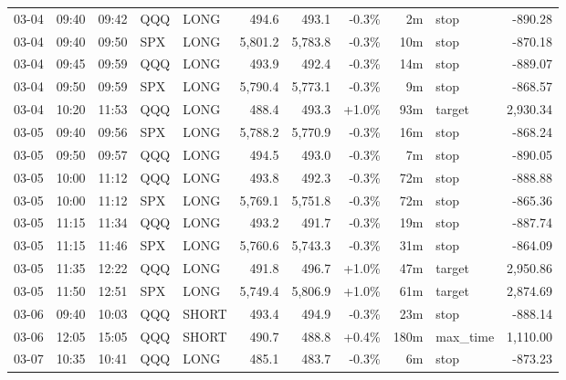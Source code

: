 \documentclass[11pt,a4paper,twoside]{article}
\begin{document}
\begin{center}
\begin{longtable}{>{\color{txtmain}}l l l l l r r r r >{\color{txtmain}}l r}
03-04 & 09:40 & 09:42 & QQQ & LONG & 494.6 & 493.1 & \textcolor{lossred}{-0.3\%} & 2m & stop & \textcolor{lossred}{-890.28} \\
03-04 & 09:40 & 09:50 & SPX & LONG & 5,801.2 & 5,783.8 & \textcolor{lossred}{-0.3\%} & 10m & stop & \textcolor{lossred}{-870.18} \\
03-04 & 09:45 & 09:59 & QQQ & LONG & 493.9 & 492.4 & \textcolor{lossred}{-0.3\%} & 14m & stop & \textcolor{lossred}{-889.07} \\
03-04 & 09:50 & 09:59 & SPX & LONG & 5,790.4 & 5,773.1 & \textcolor{lossred}{-0.3\%} & 9m & stop & \textcolor{lossred}{-868.57} \\
03-04 & 10:20 & 11:53 & QQQ & LONG & 488.4 & 493.3 & \textcolor{wingreen}{+1.0\%} & 93m & target & \textcolor{wingreen}{2,930.34} \\
03-05 & 09:40 & 09:56 & SPX & LONG & 5,788.2 & 5,770.9 & \textcolor{lossred}{-0.3\%} & 16m & stop & \textcolor{lossred}{-868.24} \\
03-05 & 09:50 & 09:57 & QQQ & LONG & 494.5 & 493.0 & \textcolor{lossred}{-0.3\%} & 7m & stop & \textcolor{lossred}{-890.05} \\
03-05 & 10:00 & 11:12 & QQQ & LONG & 493.8 & 492.3 & \textcolor{lossred}{-0.3\%} & 72m & stop & \textcolor{lossred}{-888.88} \\
03-05 & 10:00 & 11:12 & SPX & LONG & 5,769.1 & 5,751.8 & \textcolor{lossred}{-0.3\%} & 72m & stop & \textcolor{lossred}{-865.36} \\
03-05 & 11:15 & 11:34 & QQQ & LONG & 493.2 & 491.7 & \textcolor{lossred}{-0.3\%} & 19m & stop & \textcolor{lossred}{-887.74} \\
03-05 & 11:15 & 11:46 & SPX & LONG & 5,760.6 & 5,743.3 & \textcolor{lossred}{-0.3\%} & 31m & stop & \textcolor{lossred}{-864.09} \\
03-05 & 11:35 & 12:22 & QQQ & LONG & 491.8 & 496.7 & \textcolor{wingreen}{+1.0\%} & 47m & target & \textcolor{wingreen}{2,950.86} \\
03-05 & 11:50 & 12:51 & SPX & LONG & 5,749.4 & 5,806.9 & \textcolor{wingreen}{+1.0\%} & 61m & target & \textcolor{wingreen}{2,874.69} \\
03-06 & 09:40 & 10:03 & QQQ & SHORT & 493.4 & 494.9 & \textcolor{lossred}{-0.3\%} & 23m & stop & \textcolor{lossred}{-888.14} \\
03-06 & 12:05 & 15:05 & QQQ & SHORT & 490.7 & 488.8 & \textcolor{wingreen}{+0.4\%} & 180m & max\_time & \textcolor{wingreen}{1,110.00} \\
03-07 & 10:35 & 10:41 & QQQ & LONG & 485.1 & 483.7 & \textcolor{lossred}{-0.3\%} & 6m & stop & \textcolor{lossred}{-873.23} \\

\end{longtable}
\end{center}
\end{document}
